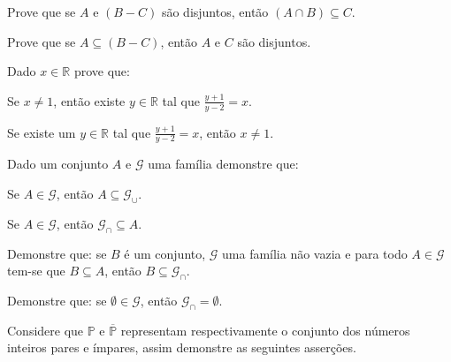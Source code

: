 \begin{problem}\label{prob:Demosntracoes2}
	Prove que se $A$ e $(B - C)$ são disjuntos, então $(A \cap B) \subseteq C$.
\end{problem}

\begin{problem}\label{prob:Demosntracoes3}
	Prove que se $A \subseteq (B - C)$, então $A$ e $C$ são disjuntos.
\end{problem}

\begin{problem}\label{prob:Demosntracoes4}
	Dado $x \in \mathbb{R}$ prove que:
\end{problem}

\begin{exerList}
	\item Se $x \neq 1$, então existe $y \in \mathbb{R}$ tal que $\frac{y+1}{y-2} = x$.
	\item Se existe um $y \in \mathbb{R}$ tal que  $\frac{y+1}{y-2} = x$, então $x \neq 1$.
\end{exerList}

\begin{problem}\label{prob:Demosntracoes5}
	Dado um conjunto $A$ e $\mathcal{G}$ uma família demonstre que:
\end{problem}

\begin{exerList}
	\item Se $A \in \mathcal{G}$, então $A \subseteq \mathcal{G}_{\cup}$.
	\item Se $A \in \mathcal{G}$, então $\mathcal{G}_{\cap} \subseteq A$.
\end{exerList}

\begin{problem}\label{prob:Demosntracoes6}
	Demonstre que: se $B$ é um conjunto, $\mathcal{G}$ uma família não vazia e para todo $A \in \mathcal{G}$ tem-se que $B \subseteq A$, então $B \subseteq \mathcal{G}_{\cap}$.
\end{problem}

\begin{problem}\label{prob:Demosntracoes7}
	Demonstre que: se $\emptyset \in \mathcal{G}$, então $\mathcal{G}_{\cap} = \emptyset$.
\end{problem}

\begin{problem}\label{prob:Demosntracoes8}
	Considere que $\mathbb{P}$ e $\overline{\mathbb{P}}$ representam respectivamente o conjunto dos números inteiros pares e ímpares, assim demonstre as seguintes asserções. 
\end{problem}

